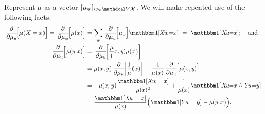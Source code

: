\begin{subappendices}
\begin{lproof}
    \def\pd/d#1[#2]{\,\frac{\partial}{\partial #1}\!\! \left[\vphantom{\Big|}#2\right]}

    Represent $\mu$ as a vector $[\mu_{w}]_{w \in \V\X}$.
    We will make repeated use of the following facts:
    \begin{align*}
        \pd/d\mu_u [\mu(X{=}x)]=
        \pd/d\mu_u [\mu(x)]
         &= \sum_w \pd/d\mu_u[\mu_w] \! \mathbbm1[X\!w{=}x]
            ~=~  \mathbbm1[ X\! u {=} x] ; \quad\text{and}\\
        \pd/d\mu_u [\mu(y|x)] &=
            \pd/d\mu_u [ \frac{\mu(x,y)}{\mu(x)}] \\
        &= \mu(x,y) \pd/d\mu_u[ \frac{1}{\mu(x)} ]
            + \frac1{\mu(x)} \pd/d\mu_u[ \mu(x,y) ] \\
        &= - \mu(x,y)\frac{\mathbbm1[ X\!u = x]}{\mu(x)^2}
             + \frac{1}{\mu(x)} \mathbbm1[X\!u {=} x \land Y\!u {=} y] \\
        &= \frac{\mathbbm1[X\!u = x]}{\mu(x)}\Big( \mathbbm1[Y\!u=y] - \mu(y|x) \Big).
    \end{align*}


\end{lproof}
\end{subappendices}
